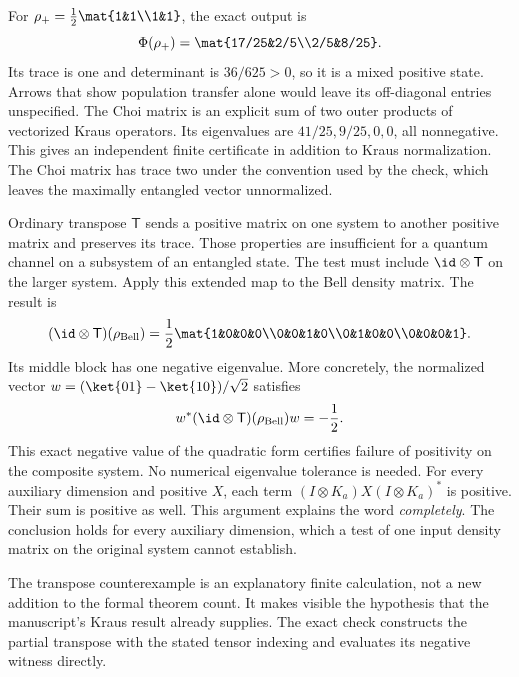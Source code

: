 For $\rho_+=\frac12\mat{1&1\\1&1}$, the exact output is
\[
\Phi(\rho_+)=\mat{17/25&2/5\\2/5&8/25}.
\]
Its trace is one and determinant is $36/625>0$, so it is a mixed positive state. Arrows that show population transfer alone would leave its off-diagonal entries unspecified.
The Choi matrix is an explicit sum of two outer products of vectorized Kraus operators. Its eigenvalues are $41/25,9/25,0,0$, all nonnegative. This gives an independent finite certificate in addition to Kraus normalization. The Choi matrix has trace two under the convention used by the check, which leaves the maximally entangled vector unnormalized.

Ordinary transpose $\mathsf T$ sends a positive matrix on one system to another positive matrix and preserves its trace. Those properties are insufficient for a quantum channel on a subsystem of an entangled state. The test must include $\id\otimes\mathsf T$ on the larger system.
Apply this extended map to the Bell density matrix. The result is
\[
(\id\otimes\mathsf T)(\rho_{\rm Bell})
=\frac12\mat{1&0&0&0\\0&0&1&0\\0&1&0&0\\0&0&0&1}.
\]
Its middle block has one negative eigenvalue. More concretely, the normalized vector $w=(\ket{01}-\ket{10})/\sqrt2$ satisfies
\[
w^*(\id\otimes\mathsf T)(\rho_{\rm Bell})w=-\frac12.
\]
This exact negative value of the quadratic form certifies failure of positivity on the composite system. No numerical eigenvalue tolerance is needed.
For every auxiliary dimension and positive $X$, each term $(I\otimes K_a)X(I\otimes K_a)^*$ is positive. Their sum is positive as well. This argument explains the word \emph{completely}. The conclusion holds for every auxiliary dimension, which a test of one input density matrix on the original system cannot establish.

The transpose counterexample is an explanatory finite calculation, not a new addition to the formal theorem count. It makes visible the hypothesis that the manuscript's Kraus result already supplies. The exact check constructs the partial transpose with the stated tensor indexing and evaluates its negative witness directly.

